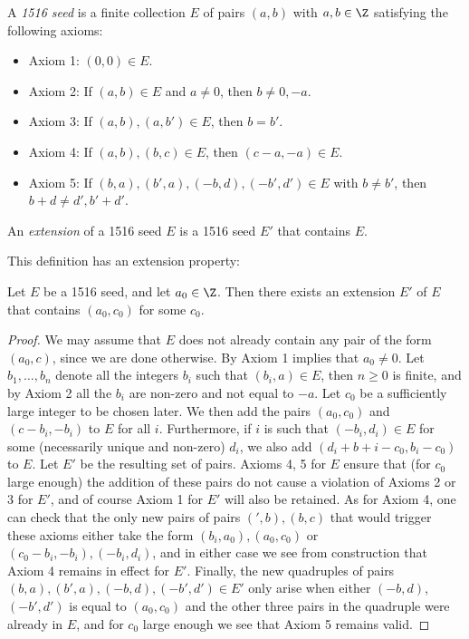 \begin{definition}[1516 seed]\label{1516-seed}  A \emph{1516 seed} is a finite collection $E$ of pairs $(a,b)$ with $a,b \in \Z$ satisfying the following axioms:
  \begin{itemize}
  \item Axiom 1: $(0,0) \in E$.
  \item Axiom 2: If $(a,b) \in E$ and $a \neq 0$, then $b \neq 0, -a$.
  \item Axiom 3: If $(a,b), (a,b') \in E$, then $b=b'$.
  \item Axiom 4: If $(a,b), (b,c) \in E$, then $(c-a,-a) \in E$.
  \item Axiom 5: If $(b,a), (b',a), (-b, d), (-b',d') \in E$ with $b \neq b'$, then $b+d \neq d', b'+d'$.
  \end{itemize}
An \emph{extension} of a 1516 seed $E$ is a 1516 seed $E'$ that contains $E$.
\end{definition}

This definition has an extension property:

\begin{lemma}[1516 extension]\label{1516-ext}  Let $E$ be a 1516 seed, and let $a_0 \in \Z$.  Then there exists an extension $E'$ of $E$ that contains $(a_0,c_0)$ for some $c_0$.
\end{lemma}

\begin{proof}  We may assume that $E$ does not already contain any pair of the form $(a_0,c)$, since we are done otherwise.  By Axiom 1 implies that $a_0 \neq 0$.  Let $b_1,\dots,b_n$ denote all the integers $b_i$ such that $(b_i,a) \in E$, then $n \geq 0$ is finite, and by Axiom 2 all the $b_i$ are non-zero and not equal to $-a$.  Let $c_0$ be a sufficiently large integer to be chosen later.  We then add the pairs $(a_0,c_0)$ and $(c-b_i,-b_i)$ to $E$ for all $i$.  Furthermore, if $i$ is such that $(-b_i,d_i) \in E$ for some (necessarily unique and non-zero) $d_i$, we also add $(d_i+b+i-c_0, b_i-c_0)$ to $E$.  Let $E'$ be the resulting set of pairs. Axioms 4, 5 for $E$ ensure that (for $c_0$ large enough) the addition of these pairs do not cause a violation of Axioms 2 or 3 for $E'$, and of course Axiom 1 for $E'$ will also be retained.  As for Axiom 4, one can check that the only new pairs of pairs $(',b), (b,c)$ that would trigger these axioms either take the form $(b_i,a_0), (a_0,c_0)$ or $(c_0-b_i,-b_i), (-b_i,d_i)$, and in either case we see from construction that Axiom 4 remains in effect for $E'$.  Finally, the new quadruples of pairs $(b,a), (b',a), (-b, d), (-b',d') \in E'$ only arise when either $(-b,d)$, $(-b',d')$ is equal to $(a_0,c_0)$ and the other three pairs in the quadruple were already in $E$, and for $c_0$ large enough we see that Axiom 5 remains valid.
\end{proof}

